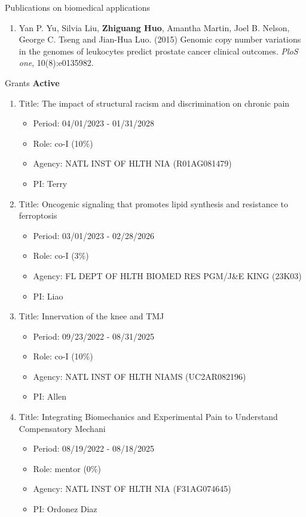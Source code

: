 \documentclass{resume} %
\begin{document}
\begin{rSection}{Publications on biomedical applications}
\begin{enumerate}[noitemsep,topsep=0pt,resume]
    \item Yan P. Yu, Silvia Liu, {\bf Zhiguang Huo}, Amantha Martin, Joel B. Nelson, George C. Tseng and Jian-Hua Luo. (2015) Genomic copy number variations in the genomes of leukocytes predict prostate cancer clinical outcomes. \emph{PloS one}, 10(8):e0135982.

\end{enumerate}


\end{rSection}

\begin{rSection}{Grants}
\textbf{Active}

\begin{enumerate}[noitemsep,topsep=0pt]
\item Title: The impact of structural racism and discrimination on chronic pain
\begin{itemize}[noitemsep,topsep=0pt,leftmargin=*]
\item[] Period: 04/01/2023 - 01/31/2028
\item[] Role: co-I (10\%)
\item[] Agency: NATL INST OF HLTH NIA (R01AG081479)
\item[] PI: Terry
\end{itemize}

\item Title: Oncogenic signaling that promotes lipid synthesis and resistance to ferroptosis
\begin{itemize}[noitemsep,topsep=0pt,leftmargin=*]
\item[] Period: 03/01/2023 - 02/28/2026
\item[] Role: co-I (3\%)
\item[] Agency: FL DEPT OF HLTH BIOMED RES PGM/J\&E KING (23K03)
\item[] PI: Liao
\end{itemize}

\item Title: Innervation of the knee and TMJ
\begin{itemize}[noitemsep,topsep=0pt,leftmargin=*]
\item[] Period: 09/23/2022 - 08/31/2025
\item[] Role: co-I (10\%)
\item[] Agency: NATL INST OF HLTH NIAMS (UC2AR082196)
\item[] PI: Allen
\end{itemize}

\item Title: Integrating Biomechanics and Experimental Pain to Understand Compensatory Mechani
\begin{itemize}[noitemsep,topsep=0pt,leftmargin=*]
\item[] Period: 08/19/2022 - 08/18/2025
\item[] Role: mentor (0\%)
\item[] Agency: NATL INST OF HLTH NIA (F31AG074645)
\item[] PI: Ordonez Diaz
\end{itemize}


\end{enumerate}
\end{rSection}
\end{document}

